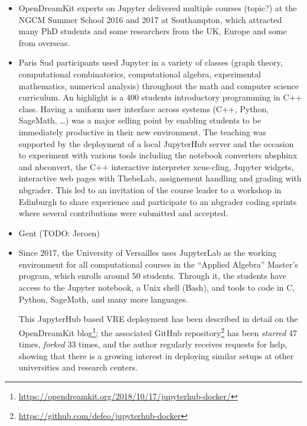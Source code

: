 \documentclass{deliverablereport}
\begin{document}
\begin{itemize}
\item
  OpenDreamKit experts on Jupyter delivered multiple courses (topic?) at
  the NGCM Summer School 2016 and 2017 at Southampton, which attracted
  many PhD students and some researchers from the UK, Europe and some
  from overseas.
\item
  Paris Sud participants used Jupyter in a variety of classes (graph
  theory, computational combinatorics, computational algebra,
  experimental mathematics, numerical analysis) throughout the math and
  computer science curriculum. An highlight is a 400 students
  introductory programming in C++ class. Having a uniform user interface
  across systems (C++, Python, SageMath, \ldots) was a major selling
  point by enabling students to be immediately productive in their new
  environment. The teaching was supported by the deployment of a local
  JupyterHub server and the occasion to experiment with various tools
  including the notebook converters nbsphinx and nbconvert, the C++
  interactive interpreter xeus-cling, Jupyter widgets, interactive web
  pages with ThebeLab, assignement handling and grading with nbgrader.
  This led to an invitation of the course leader to a workshop in
  Edinburgh to share experience and participate to an nbgrader coding
  sprints where several contributions were submitted and accepted.
\item
  Gent (TODO: Jeroen)
\item Since 2017, the University of Versailles uses JupyterLab as the
  working environment for all computational courses in the ``Applied
  Algebra'' Master's program, which enrolls around 50
  students. Through it, the students have access to the Jupyter
  notebook, a Unix shell (Bash), and tools to code in C, Python,
  SageMath, and many more languages.

  This JupyterHub based VRE deployment has been described in detail on
  the OpenDreamKit
  blog\footnote{\url{https://opendreamkit.org/2018/10/17/jupyterhub-docker/}};
  the associated GitHub
  repository\footnote{\url{https://github.com/defeo/jupyterhub-docker}}
  has been \emph{starred} 47 times, \emph{forked} 33 times, and the
  author regularly receives requests for help, showing that there is a
  growing interest in deploying similar setups at other universities
  and research centers.


\end{itemize}
\end{document}
